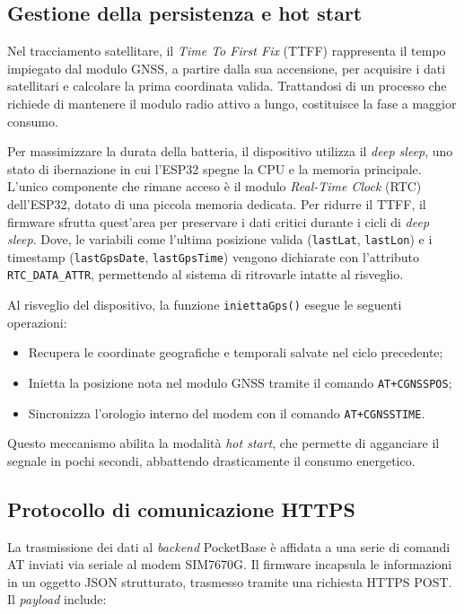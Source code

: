 \documentclass[12pt,a4paper]{article}
\begin{document}
\subsection{Gestione della persistenza e hot start}

Nel tracciamento satellitare, il \textit{Time To First Fix} (TTFF) 
rappresenta il tempo impiegato dal modulo GNSS, a partire dalla sua accensione, 
per acquisire i dati satellitari e calcolare la prima coordinata valida. 
Trattandosi di un processo che richiede di mantenere il modulo radio attivo a lungo, 
costituisce la fase a maggior consumo.

Per massimizzare la durata della batteria, il dispositivo utilizza il \textit{deep sleep}, 
uno stato di ibernazione in cui l'ESP32 spegne la CPU e la memoria principale. 
L'unico componente che rimane acceso è il modulo \textit{Real-Time Clock} (RTC) dell'ESP32, 
dotato di una piccola memoria dedicata. 
Per ridurre il TTFF, il firmware sfrutta quest'area per preservare i dati critici durante i cicli di \textit{deep sleep}.  
Dove, le variabili come l'ultima posizione valida (\texttt{lastLat}, \texttt{lastLon}) 
e i timestamp (\texttt{lastGpsDate}, \texttt{lastGpsTime}) vengono dichiarate con l'attributo \texttt{RTC\_DATA\_ATTR}, 
permettendo al sistema di ritrovarle intatte al risveglio.

\newpage

Al risveglio del dispositivo, la funzione \texttt{iniettaGps()} esegue le seguenti operazioni:
\begin{itemize}
    \item Recupera le coordinate geografiche e temporali salvate nel ciclo precedente;
    \item Inietta la posizione nota nel modulo GNSS tramite il comando \texttt{AT+CGNSSPOS};
    \item Sincronizza l'orologio interno del modem con il comando \texttt{AT+CGNSSTIME}.
\end{itemize}

Questo meccanismo abilita la modalità \textit{hot start}, 
che permette di agganciare il segnale in pochi secondi, 
abbattendo drasticamente il consumo energetico.

\subsection{Protocollo di comunicazione HTTPS}

La trasmissione dei dati al \textit{backend} PocketBase è affidata a una serie di comandi AT inviati
via seriale al modem SIM7670G. Il firmware incapsula le informazioni in un oggetto JSON
strutturato, trasmesso tramite una richiesta HTTPS POST. Il \textit{payload} include:
\end{document}

